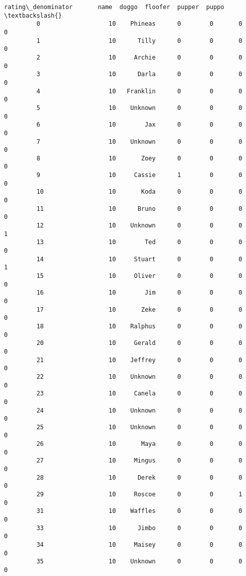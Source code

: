 \documentclass[11pt]{article}
\begin{document}
\begin{Verbatim}[commandchars=\\\{\}]
             rating\_denominator       name  doggo  floofer  pupper  puppo  \textbackslash{}
         0                   10    Phineas      0        0       0      0   
         1                   10      Tilly      0        0       0      0   
         2                   10     Archie      0        0       0      0   
         3                   10      Darla      0        0       0      0   
         4                   10   Franklin      0        0       0      0   
         5                   10    Unknown      0        0       0      0   
         6                   10        Jax      0        0       0      0   
         7                   10    Unknown      0        0       0      0   
         8                   10       Zoey      0        0       0      0   
         9                   10     Cassie      1        0       0      0   
         10                  10       Koda      0        0       0      0   
         11                  10      Bruno      0        0       0      0   
         12                  10    Unknown      0        0       0      1   
         13                  10        Ted      0        0       0      0   
         14                  10     Stuart      0        0       0      1   
         15                  10     Oliver      0        0       0      0   
         16                  10        Jim      0        0       0      0   
         17                  10       Zeke      0        0       0      0   
         18                  10    Ralphus      0        0       0      0   
         20                  10     Gerald      0        0       0      0   
         21                  10    Jeffrey      0        0       0      0   
         22                  10    Unknown      0        0       0      0   
         23                  10     Canela      0        0       0      0   
         24                  10    Unknown      0        0       0      0   
         25                  10    Unknown      0        0       0      0   
         26                  10       Maya      0        0       0      0   
         27                  10     Mingus      0        0       0      0   
         28                  10      Derek      0        0       0      0   
         29                  10     Roscoe      0        0       1      0   
         31                  10    Waffles      0        0       0      0   
         33                  10      Jimbo      0        0       0      0   
         34                  10     Maisey      0        0       0      0   
         35                  10    Unknown      0        0       0      0   

\end{Verbatim}
\end{document}
